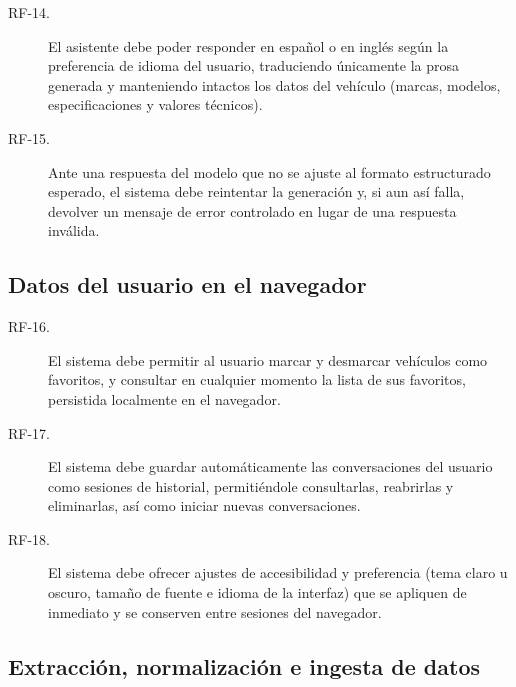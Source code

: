 \begin{description}
  \item[RF-14.] El asistente debe poder responder en español o en inglés según
        la preferencia de idioma del usuario, traduciendo únicamente la prosa
        generada y manteniendo intactos los datos del vehículo (marcas,
        modelos, especificaciones y valores técnicos).

  \item[RF-15.] Ante una respuesta del modelo que no se ajuste al formato
        estructurado esperado, el sistema debe reintentar la generación y, si
        aun así falla, devolver un mensaje de error controlado en lugar de una
        respuesta inválida.
\end{description}

\subsection{Datos del usuario en el navegador}

\begin{description}
  \item[RF-16.] El sistema debe permitir al usuario marcar y desmarcar
        vehículos como favoritos, y consultar en cualquier momento la lista de
        sus favoritos, persistida localmente en el navegador.

  \item[RF-17.] El sistema debe guardar automáticamente las conversaciones del
        usuario como sesiones de historial, permitiéndole consultarlas,
        reabrirlas y eliminarlas, así como iniciar nuevas conversaciones.

  \item[RF-18.] El sistema debe ofrecer ajustes de accesibilidad y preferencia
        (tema claro u oscuro, tamaño de fuente e idioma de la interfaz) que se
        apliquen de inmediato y se conserven entre sesiones del navegador.
\end{description}

\subsection{Extracción, normalización e ingesta de datos}

